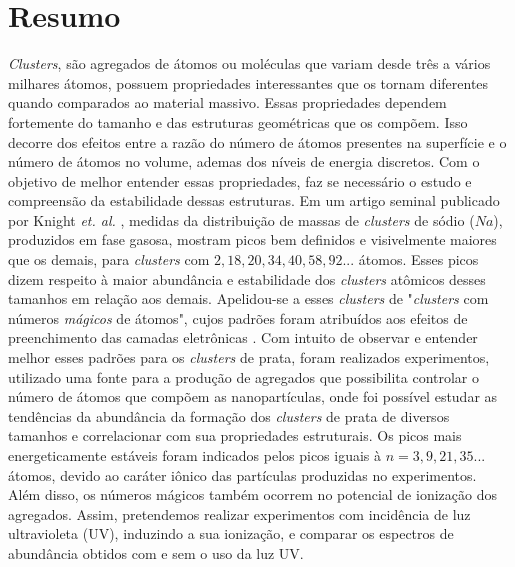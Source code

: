 \chapter*{Resumo}

\textit{Clusters}, são agregados de átomos ou moléculas que variam desde três a vários milhares átomos, possuem propriedades interessantes que os tornam diferentes quando comparados ao material massivo. Essas propriedades dependem fortemente do tamanho e das estruturas geométricas que os compõem. Isso decorre dos efeitos entre a razão do número de átomos presentes na superfície e o número de átomos no
volume, ademas dos níveis  de energia discretos. Com o objetivo de melhor entender essas propriedades, faz se necessário o estudo e compreensão da estabilidade dessas estruturas. Em um artigo seminal publicado por Knight \textit{et. al.} \cite{electronic_Shell_sodium}, medidas da distribuição de massas de \textit{clusters} de sódio ($Na$), produzidos em fase gasosa, mostram picos bem definidos e visivelmente maiores que os demais, para \textit{clusters} com $2, 18, 20, 34, 40, 58,92 ...$ átomos. Esses picos dizem respeito à maior abundância e estabilidade dos \textit{clusters} atômicos desses tamanhos em relação aos demais. Apelidou-se a esses \textit{clusters} de "\textit{clusters} com números
\textit{mágicos} de átomos", cujos padrões foram atribuídos aos efeitos de preenchimento das camadas eletrônicas \cite{Brack}. Com intuito de observar e entender melhor esses padrões para os \textit{clusters} de prata, foram realizados experimentos, utilizado uma fonte para a produção
de agregados que possibilita controlar o número de átomos que compõem as nanopartículas, onde foi possível estudar as tendências da abundância da formação dos \textit{clusters} de prata de diversos tamanhos e correlacionar com sua propriedades estruturais. Os picos mais energeticamente estáveis foram indicados pelos picos iguais à $n= 3,9,21,35...$ átomos, devido ao caráter iônico das partículas produzidas no experimentos. Além disso, os números mágicos também ocorrem no potencial de ionização dos agregados. Assim, pretendemos realizar experimentos com incidência de luz ultravioleta (UV), induzindo a sua ionização, e comparar os espectros de abundância obtidos com e sem o uso da luz UV. 


\newpage

$ $